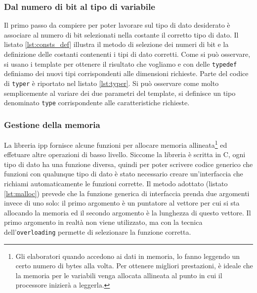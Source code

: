 \subsubsection{Dal numero di bit al tipo di variabile}
Il primo passo da compiere per poter lavorare sul tipo di dato desiderato \`e
associare al numero di bit selezionati nella costante il corretto tipo di dato.
Il listato \ref{lst:consts_def} illustra il metodo di selezione dei numeri di bit e
la definizione delle costanti contenenti i tipi di dato corretti. Come si pu\`o
osservare, si usano i template per ottenere il risultato che vogliamo e con
delle \texttt{typedef} definiamo dei nuovi tipi corrispondenti alle dimensioni
richieste. Parte del codice di \texttt{typer} \`e riportato nel listato
\ref{lst:typer}. Si pu\`o osservare come molto semplicemente al variare dei due
parametri del template, si definisce un tipo denominato \texttt{type}
corrispondente alle caratteristiche richieste.





\subsubsection{Gestione della memoria}
La libreria \ac{ipp} fornisce alcune funzioni per allocare memoria
allineata\footnote{Gli elaboratori quando accedono ai dati in memoria, lo fanno
leggendo un certo numero di bytes alla volta. Per ottenere migliori
prestazioni, \`e ideale che la memoria per le variabili venga allocata
allineata al punto in cui il processore inizier\`a a leggerla.} ed effetuare
altre operazioni di basso livello. Siccome la libreria \`e scritta in C, ogni
tipo di dato ha una funzione diversa, quindi per poter scrivere codice generico
che funzioni con qualunque tipo di dato \`e stato necessario creare
un'interfaccia \CC che richiami automaticamente le funzioni corrette. Il metodo
adottato (listato \ref{lst:malloc}) prevede che la funzione generica di
interfaccia prenda due argomenti invece di uno solo: il primo argomento \`e un
puntatore al vettore per cui si sta allocando la memoria ed il secondo
argomento \`e la lunghezza di questo vettore. Il primo argomento in realt\`a
non viene utilizzato, ma con la tecnica dell'\texttt{overloading} permette di
selezionare la funzione corretta.

